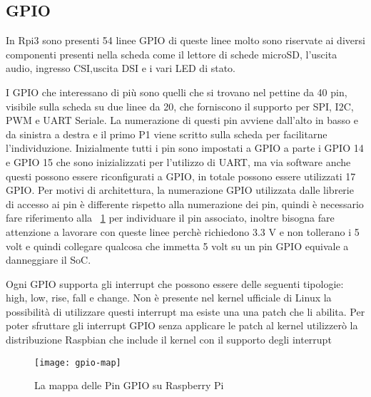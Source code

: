 \subsection{GPIO}
In Rpi3 sono presenti 54 linee GPIO di queste linee molto sono riservate ai diversi componenti presenti nella scheda  come il lettore di schede microSD, l'uscita audio, ingresso CSI,uscita DSI e i vari LED di stato.

I GPIO che interessano di più sono quelli che si trovano nel pettine da 40 pin, visibile sulla scheda su due linee da 20, che forniscono il supporto per SPI, I2C, PWM e UART Seriale.
La numerazione di questi pin avviene dall'alto in basso e da sinistra a destra e il primo P1 viene scritto sulla scheda per facilitarne l'individuzione.
Inizialmente tutti i pin sono impostati a GPIO a parte i GPIO 14 e GPIO 15 che sono inizializzati per l'utilizzo di UART, ma via software anche questi possono essere riconfigurati a GPIO, in totale possono essere utilizzati 17 GPIO.
Per motivi di architettura, la numerazione GPIO utilizzata dalle librerie di accesso ai pin è differente rispetto alla numerazione dei pin, quindi è necessario fare riferimento alla \figurename~\ref{fig:gpio-map} per individuare il pin associato, inoltre bisogna fare attenzione a lavorare con queste linee perchè richiedono 3.3 V e non tollerano i 5 volt e quindi collegare qualcosa che immetta 5 volt su un pin GPIO equivale a danneggiare il SoC.

Ogni GPIO supporta gli interrupt che possono essere delle seguenti tipologie:  high, low,  rise,  fall  e  change.   
Non è presente nel kernel ufficiale di Linux la possibilità di utilizzare questi interrupt ma esiste una una patch che li abilita.
Per poter sfruttare gli interrupt GPIO senza applicare le patch al kernel utilizzerò la distribuzione Raspbian che include il kernel con il supporto degli interrupt


\begin{figure}[htbp!] 
	\centering    
	\texttt{[image: gpio-map]}
	\caption[Mappa GPIO]{La mappa delle Pin GPIO su Raspberry Pi}
	\label{fig:gpio-map}
\end{figure}


